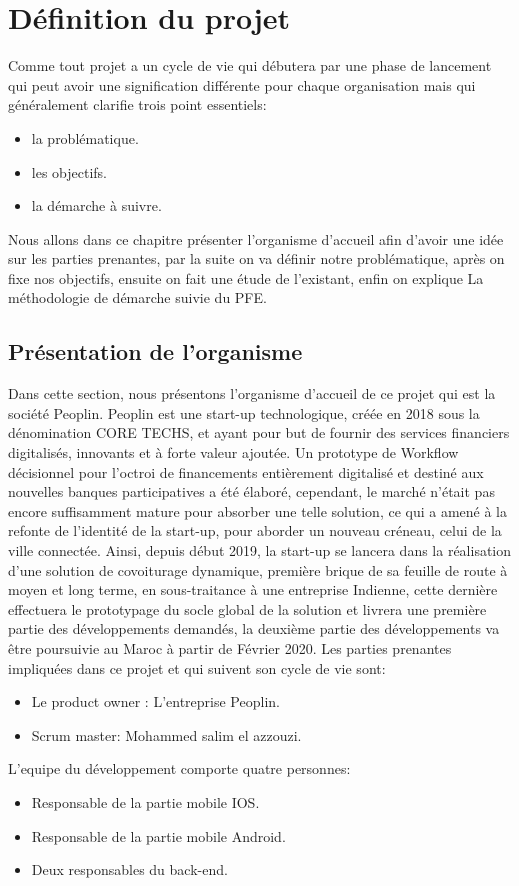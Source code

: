 \chapter{Définition du projet}

Comme tout projet a un cycle de vie qui débutera par une phase de lancement qui peut avoir une signification différente pour chaque organisation mais qui généralement clarifie trois point essentiels:
\begin{itemize}
	\item la problématique.
	\item les objectifs.
	\item la démarche à suivre.
\end{itemize}
Nous allons dans ce chapitre présenter l'organisme d’accueil afin d'avoir une idée sur les parties prenantes, par la suite on va définir notre problématique, après on fixe nos objectifs, ensuite on fait une étude de l'existant, enfin on explique La méthodologie de démarche suivie du PFE.


\section{Présentation de l’organisme}

Dans cette section, nous présentons l’organisme d’accueil de ce projet qui est la société Peoplin.\newline
Peoplin est une start-up technologique, créée en 2018 sous la dénomination CORE TECHS, et ayant pour but de fournir des services financiers digitalisés, innovants et à forte valeur ajoutée. Un prototype de Workflow décisionnel pour l’octroi de financements entièrement digitalisé et destiné aux nouvelles banques participatives a été élaboré, cependant, le marché n’était pas encore suffisamment mature pour absorber une telle solution, ce qui a amené à la refonte de l’identité de la start-up, pour aborder un nouveau créneau, celui de la ville connectée.\newline 
Ainsi, depuis début 2019, la start-up se lancera dans la réalisation d’une solution de covoiturage dynamique, première brique de sa feuille de route à moyen et long terme, en sous-traitance à une entreprise Indienne, cette dernière effectuera le prototypage du socle global de la solution et livrera une première partie des développements demandés, la deuxième partie des développements va être poursuivie au Maroc à partir de Février 2020.\newline
Les parties prenantes impliquées dans ce projet et qui suivent son cycle de vie sont: 
\begin{itemize}
	\item Le product owner : L’entreprise Peoplin.
	\item Scrum master: Mohammed salim el azzouzi.
\end{itemize}
L'equipe du développement comporte quatre personnes:
\begin{itemize}
	\item Responsable de la partie mobile IOS.
	\item Responsable de la partie mobile Android.
	\item Deux responsables du back-end.
\end{itemize}

